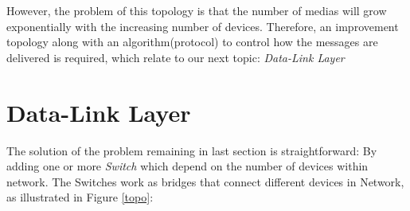 \documentclass[10pt,a4paper]{article}
\begin{document}
However, the problem of this topology is that the number of medias will grow exponentially with the increasing number of devices. Therefore, an improvement topology along with an algorithm(protocol) to control how the messages are delivered is required, which relate to our next topic: \textit{Data-Link Layer}

\section{Data-Link Layer}
The solution of the problem remaining in last section is straightforward: By adding one or more \textit{Switch} which depend on the number of devices within network. The Switches work as bridges that connect different devices in Network, as illustrated in Figure \ref{topo}:
\begin{figure}[H]
\center
{} \\


\end{figure}
\end{document}

